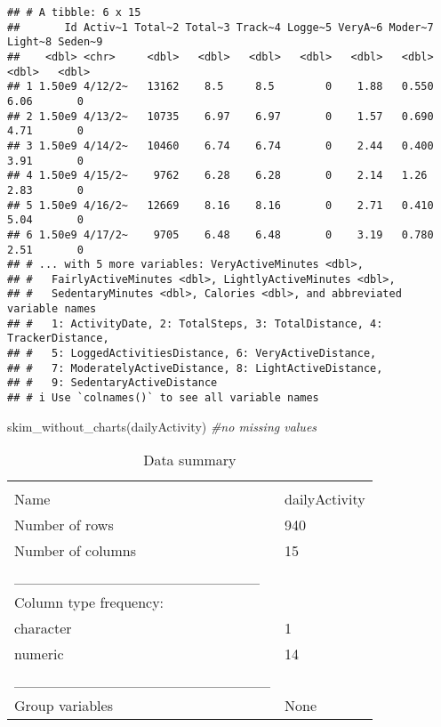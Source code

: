 \documentclass[
]{article}
\newenvironment{Shaded}{\begin{snugshade}}{\end{snugshade}}
\newcommand{\CommentTok}[1]{\textcolor[rgb]{0.56,0.35,0.01}{\textit{#1}}}
\newcommand{\FunctionTok}[1]{\textcolor[rgb]{0.00,0.00,0.00}{#1}}
\newcommand{\NormalTok}[1]{#1}
\begin{document}
\begin{verbatim}
## # A tibble: 6 x 15
##       Id Activ~1 Total~2 Total~3 Track~4 Logge~5 VeryA~6 Moder~7 Light~8 Seden~9
##    <dbl> <chr>     <dbl>   <dbl>   <dbl>   <dbl>   <dbl>   <dbl>   <dbl>   <dbl>
## 1 1.50e9 4/12/2~   13162    8.5     8.5        0    1.88   0.550    6.06       0
## 2 1.50e9 4/13/2~   10735    6.97    6.97       0    1.57   0.690    4.71       0
## 3 1.50e9 4/14/2~   10460    6.74    6.74       0    2.44   0.400    3.91       0
## 4 1.50e9 4/15/2~    9762    6.28    6.28       0    2.14   1.26     2.83       0
## 5 1.50e9 4/16/2~   12669    8.16    8.16       0    2.71   0.410    5.04       0
## 6 1.50e9 4/17/2~    9705    6.48    6.48       0    3.19   0.780    2.51       0
## # ... with 5 more variables: VeryActiveMinutes <dbl>,
## #   FairlyActiveMinutes <dbl>, LightlyActiveMinutes <dbl>,
## #   SedentaryMinutes <dbl>, Calories <dbl>, and abbreviated variable names
## #   1: ActivityDate, 2: TotalSteps, 3: TotalDistance, 4: TrackerDistance,
## #   5: LoggedActivitiesDistance, 6: VeryActiveDistance,
## #   7: ModeratelyActiveDistance, 8: LightActiveDistance,
## #   9: SedentaryActiveDistance
## # i Use `colnames()` to see all variable names
\end{verbatim}

\begin{Shaded}
\begin{Highlighting}[]
\FunctionTok{skim\_without\_charts}\NormalTok{(dailyActivity) }\CommentTok{\#no missing values}
\end{Highlighting}
\end{Shaded}

\begin{longtable}[]{@{}ll@{}}
\caption{Data summary}\tabularnewline
\toprule
& \\
\midrule
\endfirsthead
\toprule
& \\
\midrule
\endhead
Name & dailyActivity \\
Number of rows & 940 \\
Number of columns & 15 \\
\_\_\_\_\_\_\_\_\_\_\_\_\_\_\_\_\_\_\_\_\_\_\_ & \\
Column type frequency: & \\
character & 1 \\
numeric & 14 \\
\_\_\_\_\_\_\_\_\_\_\_\_\_\_\_\_\_\_\_\_\_\_\_\_ & \\
Group variables & None \\
\bottomrule
\end{longtable}
\end{document}
